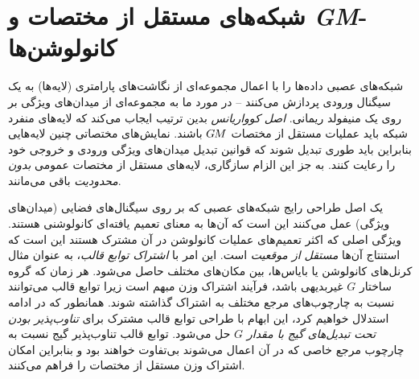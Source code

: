 

\section{شبکه‌های مستقل از مختصات و \textit{GM}-کانولوشن‌ها}
\label{sec:gauge_CNNs_local}


شبکه‌های عصبی داده‌ها را با اعمال مجموعه‌ای از نگاشت‌های پارامتری (لایه‌ها) به یک سیگنال ورودی پردازش می‌کنند -- در مورد ما به مجموعه‌ای از میدان‌های ویژگی بر روی یک منیفولد ریمانی.
\emph{اصل کوواریانس} بدین ترتیب ایجاب می‌کند که لایه‌های منفرد شبکه باید عملیات مستقل از مختصات $G\mkern-1.4muM$ باشند.
نمایش‌های مختصاتی چنین لایه‌هایی بنابراین باید طوری تبدیل شوند که قوانین تبدیل میدان‌های ویژگی ورودی و خروجی خود را رعایت کنند.
به جز این الزام سازگاری، لایه‌های مستقل از مختصات عمومی \emph{بدون محدودیت} باقی می‌مانند.


یک اصل طراحی رایج شبکه‌های عصبی که بر روی سیگنال‌های فضایی (میدان‌های ویژگی) عمل می‌کنند این است که آن‌ها به معنای تعمیم یافته‌ای کانولوشنی هستند.
ویژگی اصلی که اکثر تعمیم‌های عملیات کانولوشن در آن مشترک هستند این است که استنتاج آن‌ها \emph{مستقل از موقعیت} است.
این امر با \emph{اشتراک توابع قالب}، به عنوان مثال کرنل‌های کانولوشن یا بایاس‌ها، بین مکان‌های مختلف حاصل می‌شود.
هر زمان که گروه ساختار $G$ غیربدیهی باشد، فرآیند اشتراک وزن مبهم است زیرا توابع قالب می‌توانند نسبت به چارچوب‌های مرجع مختلف به اشتراک گذاشته شوند.
همانطور که در ادامه استدلال خواهیم کرد، این ابهام با طراحی توابع قالب مشترک برای \emph{تناوب‌پذیر بودن تحت تبدیل‌های گیج با مقدار $G$} حل می‌شود.
توابع قالب تناوب‌پذیر گیج نسبت به چارچوب مرجع خاصی که در آن اعمال می‌شوند بی‌تفاوت خواهند بود و بنابراین امکان اشتراک وزن مستقل از مختصات را فراهم می‌کنند.



\etocsettocstyle{}{} %
\localtableofcontents



